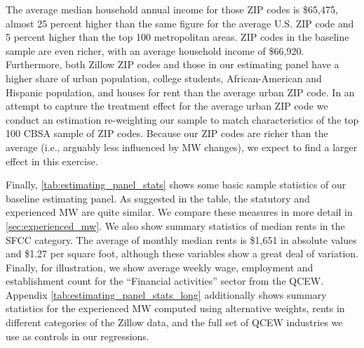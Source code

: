 The average median household annual income for those ZIP codes is \$65,475, almost 25 
percent higher than the same figure for the average U.S. ZIP code and 5 percent higher than 
the top 100 metropolitan areas. ZIP codes in the baseline sample are even richer, with an
average household income of \$66,920. Furthermore, both Zillow ZIP codes and those in our 
estimating panel have a higher share of urban population, college students, African-American
and Hispanic population, and houses for rent than the average urban ZIP code. In an attempt 
to capture the treatment effect for the average urban ZIP code we conduct an estimation 
re-weighting our sample to match characteristics of the top 100 CBSA sample of ZIP codes. 
Because our ZIP codes are richer than the average (i.e., arguably less influenced by MW
changes), we expect to find a larger effect in this exercise.

Finally, \autoref{tab:estimating_panel_stats} shows some basic sample statistics of our 
baseline estimating panel. As suggested in the table, the statutory and experienced MW 
are quite similar. We compare these measures in more detail in \autoref{sec:experienced_mw}.
We also show summary statistics of median rents in the SFCC category. The average of 
monthly median rents is \$1,651 in absolute values and \$1.27 per square foot, although 
these variables show a great deal of variation. Finally, for illustration, we show average 
weekly wage, employment and establishment count for the ``Financial activities'' sector 
from the QCEW. Appendix \autoref{tab:estimating_panel_stats_long} additionally shows 
summary statistics for the experienced MW computed using alternative weights, rents in 
different categories of the Zillow data, and the full set of QCEW industries we use as 
controls in our regressions.

